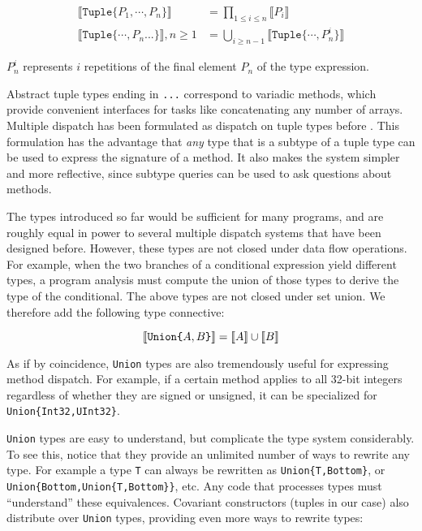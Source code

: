 \vspace{-3ex}
\begin{align*}
  \llbracket \texttt{Tuple\{}P_1,\cdots,P_n\texttt{\}} \rrbracket &= \prod_{1\leq i \leq n} \llbracket P_i \rrbracket \\
  \llbracket \texttt{Tuple\{}\cdots,P_n\texttt{...\}} \rrbracket, n\geq 1 &= \bigcup_{i\geq n-1} \llbracket \texttt{Tuple\{}\cdots,P_n^i\texttt{\}} \rrbracket
\end{align*}

\noindent
$P_n^i$ represents $i$ repetitions of the final element $P_n$ of the type expression.

Abstract tuple types ending in \texttt{...} correspond to variadic methods, which
provide convenient interfaces for tasks like concatenating any number of arrays.
Multiple dispatch has been formulated as dispatch on tuple types before \cite{Leavens1998}.
This formulation has the advantage that \emph{any} type that is a subtype of a
tuple type can be used to express the signature of a method.
It also makes the system simpler and more reflective, since subtype queries can be
used to ask questions about methods.

The types introduced so far would be sufficient for many programs, and are
roughly equal in power to several multiple dispatch systems that have been designed
before.
However, these types are not closed under data flow operations.
For example, when the two branches of a conditional expression yield different types,
a program analysis must compute the union of those types to derive the type of
the conditional.
The above types are not closed under set union.
We therefore add the following type connective:

\vspace{-3ex}
\[
  \llbracket \texttt{Union\{}A,B\texttt{\}} \rrbracket = \llbracket A \rrbracket \cup \llbracket B \rrbracket \\
\]

As if by coincidence, \texttt{Union} types are also tremendously useful for expressing
method dispatch.
For example, if a certain method applies to all 32-bit integers regardless
of whether they are signed or unsigned, it can be specialized for \texttt{Union\{Int32,UInt32\}}.

\texttt{Union} types are easy to understand, but complicate the type system considerably.
To see this, notice that they provide an unlimited number of ways to rewrite any type.
For example a type \texttt{T} can always be rewritten as \texttt{Union\{T,Bottom\}}, or
\texttt{Union\{Bottom,Union\{T,Bottom\}\}}, etc.
Any code that processes types must ``understand'' these equivalences.
Covariant constructors (tuples in our case) also distribute over \texttt{Union} types,
providing even more ways to rewrite types:


